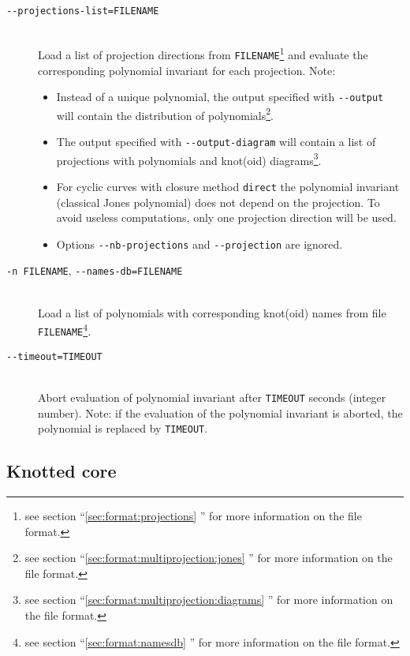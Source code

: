 \begin{description}
\item[\lstinline{--projections-list=FILENAME}]\hfill\\
  Load a list of projection directions from \lstinline{FILENAME}\footnote{see section ``\ref{sec:format:projections} '' for more information on the file format.} and evaluate the corresponding polynomial invariant for each projection. Note:
  \begin{itemize}
  \item Instead of a unique polynomial, the output specified with \lstinline{--output} will contain the distribution of polynomials\footnote{see section ``\ref{sec:format:multiprojection:jones} '' for more information on the file format.}. 
    \item The output specified with \lstinline{--output-diagram} will contain a list of projections with polynomials and knot(oid) diagrams\footnote{see section ``\ref{sec:format:multiprojection:diagrams} '' for more information on the file format.}.
    \item For cyclic curves with closure method \lstinline{direct} the polynomial invariant (classical Jones polynomial) does not depend on the projection. To avoid useless computations, only one projection direction will be used.
    \item Options  \lstinline{--nb-projections} and \lstinline{--projection} are ignored.                                  
  \end{itemize}
\item[\lstinline{-n FILENAME}, \lstinline{--names-db=FILENAME}]\hfill\\
  Load a list of polynomials with corresponding knot(oid) names from file \lstinline{FILENAME}\footnote{see section ``\ref{sec:format:namesdb} '' for more information on the file format.}.
\item[\lstinline{--timeout=TIMEOUT}]\hfill\\
  Abort evaluation of polynomial invariant after \lstinline{TIMEOUT} seconds (integer number). Note: if the evaluation of the polynomial invariant is aborted, the polynomial is replaced by \lstinline{TIMEOUT}.
\end{description}


      
\subsection{Knotted core}
